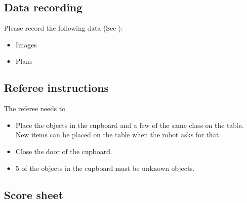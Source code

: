\subsection{Data recording}
  Please record the following data (See ):
  \begin{itemize}
   \item Images
   \item Plans
  \end{itemize}

\subsection{Referee instructions}

The referee needs to
\begin{itemize}
\item Place the objects in the cupboard and a few of the same class on the table. New items can be placed on the table when the robot asks for that. 
\item Close the door of the cupboard. 
\item 5 of the objects in the cupboard must be unknown objects.
\end{itemize}

\subsection{Score sheet}


